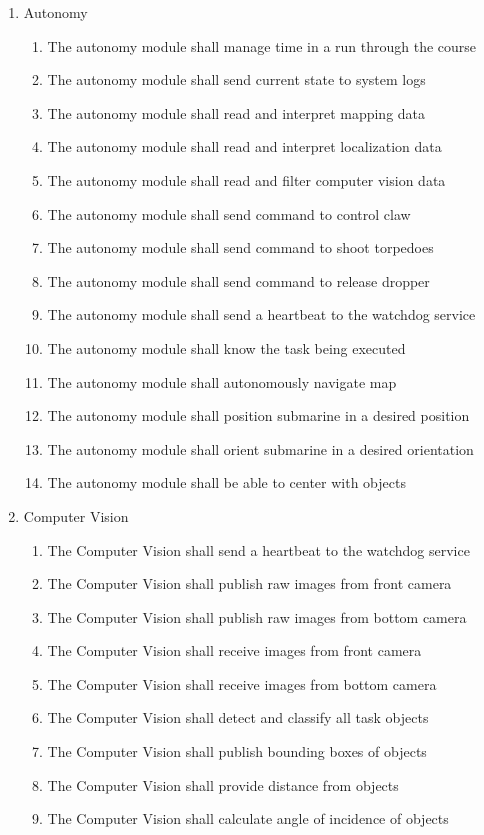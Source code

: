 \begin{enumerate}
    \item Autonomy 
        \begin{enumerate}
            \item The autonomy module shall manage time in a run through the course  
            \item The autonomy module shall send current state to system logs  
            \item The autonomy module shall read and interpret mapping data 
            \item The autonomy module shall read and interpret localization data 
            \item The autonomy module shall read and filter computer vision data 
            \item The autonomy module shall send command to control claw 
            \item The autonomy module shall send command to shoot torpedoes 
            \item The autonomy module shall send command to release dropper 
            \item The autonomy module shall send a heartbeat to the watchdog service 
            \item The autonomy module shall know the task being executed 
            \item The autonomy module shall autonomously navigate map 
            \item The autonomy module shall position submarine in a desired position 
            \item  The autonomy module shall orient submarine in a desired orientation 
            \item The autonomy module shall be able to center with objects 
        \end{enumerate}

    \item Computer Vision 
        \begin{enumerate}
            \item The Computer Vision shall send a heartbeat to the watchdog service  
            \item The Computer Vision shall publish raw images from front camera 
            \item The Computer Vision shall publish raw images from bottom camera  
            \item The Computer Vision shall receive images from front camera 
            \item The Computer Vision shall receive images from bottom camera 
            \item The Computer Vision shall detect and classify all task objects  
            \item The Computer Vision shall publish bounding boxes of objects 
            \item The Computer Vision shall provide distance from objects 
            \item The Computer Vision shall calculate angle of incidence of objects
        \end{enumerate}


\end{enumerate}
